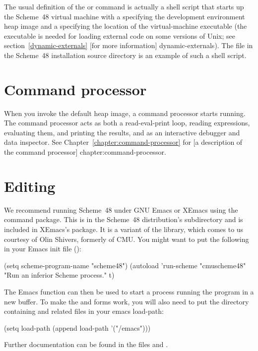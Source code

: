 The usual definition of the  or  command is actually a
 shell script that starts up the Scheme~48 virtual machine with a
specifying the development environment heap image and a
  specifying the location of the virtual-machine
 executable (the executable is needed for loading external code on some
 versions of Unix; see section~\ref{dynamic-externals}
 [for more information]
 {dynamic-externals}).
The file  in the Scheme~48 installation source directory is an example
 of such a shell script.

\section{Command processor}

When you invoke the default heap image, a command processor starts
 running.
The command processor acts as both a read-eval-print loop, reading
 expressions, evaluating them, and printing the results, and as
 an interactive debugger and data inspector.
See Chapter~\ref{chapter:command-processor} for
[a description of the command processor]
{chapter:command-processor}.

\section{Editing}

We recommend running Scheme~48 under GNU Emacs or XEmacs using the
  command package.
This is in the Scheme~48 distribution's  subdirectory and
 is included in XEmacs's  package.
It is a variant of the  library, which
 comes to us courtesy of Olin Shivers, formerly of CMU.
You might want to put the following in your Emacs init file ():
\begin{example}
(setq scheme-program-name "scheme48")
(autoload 'run-scheme
          "cmuscheme48"
          "Run an inferior Scheme process."
          t)
\end{example}
The Emacs function  can then be used to start a process
 running the program  in a new buffer.
To make the  and  forms work, you will
also need
to put the directory containing  and related files in your
emacs load-path:
\begin{example}
(setq load-path
  (append load-path '("/emacs")))
\end{example}
Further documentation can be found in the files  and
.

